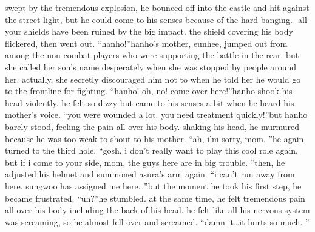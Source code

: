 swept by the tremendous explosion, he bounced off into the castle and hit against the street light, but he could come to his senses because of the hard banging.
-all your shields have been ruined by the big impact.
the shield covering his body flickered, then went out.
“hanho!”hanho’s mother, eunhee, jumped out from among the non-combat players who were supporting the battle in the rear.
 but she called her son’s name desperately when she was stopped by people around her.
 actually, she secretly discouraged him not to when he told her he would go to the frontline for fighting.
“hanho! oh, no! come over here!”hanho shook his head violently.
 he felt so dizzy but came to his senses a bit when he heard his mother’s voice.
“you were wounded a lot.
 you need treatment quickly!”but hanho barely stood, feeling the pain all over his body.
shaking his head, he murmured because he was too weak to shout to his mother.
“ah, i’m sorry, mom.
”he again turned to the third hole.
“gosh, i don’t really want to play this cool role again, but if i come to your side, mom, the guys here are in big trouble.
”then, he adjusted his helmet and summoned asura’s arm again.
“i can’t run away from here.
 sungwoo has assigned me here…”but the moment he took his first step, he became frustrated.
“uh?”he stumbled.
 at the same time, he felt tremendous pain all over his body including the back of his head.
 he felt like all his nervous system was screaming, so he almost fell over and screamed.
“damn it…it hurts so much.
”

 